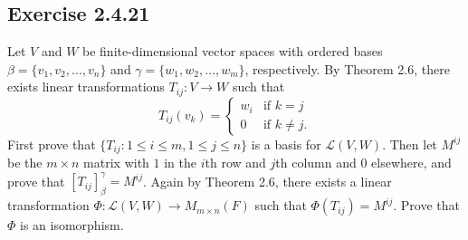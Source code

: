 \subsection*{Exercise 2.4.21} Let \( V  \) and \( W  \) be finite-dimensional vector spaces with ordered bases \( \beta = \{ {v}_{1}, {v}_{2}, \dots, {v}_{n} \}  \) and \( \gamma = \{ {w}_{1}, {w}_{2}, \dots, {w}_{m} \}  \), respectively. By Theorem 2.6, there exists linear transformations \( {T}_{ij}: V \to W  \) such that
\[  {T}_{ij}({v}_{k }) = 
\begin{cases}
    {w}_{i} &\text{if } k = j \\
    0 &\text{if } k \neq j. 
\end{cases} \]
First prove that \( \{ {T}_{ij} : 1 \leq i \leq m, 1 \leq j \leq n  \}  \) is a basis for \( \mathcal{L}(V,W)  \). Then let \( M^{ij}  \) be the \( m \times n  \) matrix with \( 1  \) in the \( i \)th row and \( j \)th column and \( 0  \) elsewhere, and prove that \( [{T}_{ij}]_{\beta}^{\gamma}  = M^{ij}  \). Again by Theorem 2.6, there exists a linear transformation \( \Phi: \mathcal{L}(V,W) \to {M}_{m \times n}(F)   \) such that \( \Phi({T}_{ij}) = M^{ij} \). Prove that \( \Phi  \) is an isomorphism.
